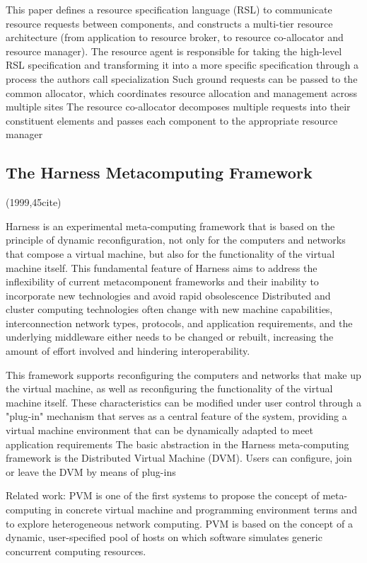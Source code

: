 \documentclass[a4paper,twoside]{scrbook}
\begin{document}
\par
This paper defines a resource specification language (RSL) to communicate resource requests between components, and constructs a multi-tier resource architecture (from application to resource broker, to resource co-allocator and resource manager).
The resource agent is responsible for taking the high-level RSL specification and transforming it into a more specific specification through a process the authors call specialization
Such ground requests can be passed to the common allocator, which coordinates resource allocation and management across multiple sites
The resource co-allocator decomposes multiple requests into their constituent elements and passes each component to the appropriate resource manager

\subsection{The Harness Metacomputing Framework
\cite{migliardi1999harness}}
(1999,45cite)\par
Harness is an experimental meta-computing framework that is based on the principle of dynamic reconfiguration, not only for the computers and networks that compose a virtual machine, but also for the functionality of the virtual machine itself. This fundamental feature of Harness aims to address the inflexibility of current metacomponent frameworks and their inability to incorporate new technologies and avoid rapid obsolescence
Distributed and cluster computing technologies often change with new machine capabilities, interconnection network types, protocols, and application requirements, and the underlying middleware either needs to be changed or rebuilt, increasing the amount of effort involved and hindering interoperability.
\par
This framework supports reconfiguring the computers and networks that make up the virtual machine, as well as reconfiguring the functionality of the virtual machine itself. These characteristics can be modified under user control through a "plug-in" mechanism that serves as a central feature of the system, providing a virtual machine environment that can be dynamically adapted to meet application requirements
The basic abstraction in the Harness meta-computing framework is the Distributed Virtual Machine (DVM). Users can configure, join or leave the DVM by means of plug-ins
\par\par
Related work:
PVM is one of the first systems to propose the concept of meta-computing in concrete virtual machine and programming environment terms and to explore heterogeneous network computing. PVM is based on the concept of a dynamic, user-specified pool of hosts on which software simulates generic concurrent computing resources.
\end{document}
